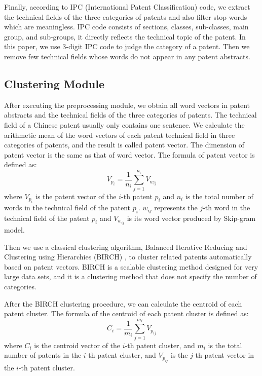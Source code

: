\documentclass[conference]{IEEEtran}
\begin{document}
\begin{CJK}{UTF8}{gbsn}
	Finally, according to IPC (International Patent Classification) code, we extract the technical fields of the three categories of patents and also filter stop words which are meaningless. IPC code consists of sections, classes, sub-classes, main group, and sub-groups, it directly reflects the technical topic of the patent. In this paper, we use 3-digit IPC code to judge the category of a patent. Then we remove few technical fields whose words do not appear in any patent abstracts.
	
	\subsection{Clustering Module}
	After executing the preprocessing module, we obtain all word vectors in patent abstracts and the technical fields of the three categories of patents. The technical field of a Chinese patent usually only contains one sentence. We calculate the arithmetic mean of the word vectors of each patent technical field in three categories of patents, and the result is called patent vector. The dimension of patent vector is the same as that of word vector. The formula of patent vector is defined as:
	\begin{equation}
	V_{p_i}=\frac{1}{n_i}\sum_{j = 1} ^{n_i} V_{w_{ij}}\label{eq1}
	\end{equation}
	where $V_{p_i}$ is the patent vector of the $i$-th patent $p_i$ and $n_i$ is the total number of words in the technical field of the patent $p_i$. $w_{ij}$ represents the $j$-th word in the technical field of the patent $p_i$ and $V_{w_{ij}}$ is its word vector produced by Skip-gram model.
	
	Then we use a classical clustering algorithm, Balanced Iterative Reducing and Clustering using Hierarchies (BIRCH) \cite{b24}, to cluster related patents automatically based on patent vectors. BIRCH is a scalable clustering method designed for very large data sets, and it is a clustering method that does not specify the number of categories.
	
	After the BIRCH clustering procedure, we can calculate the centroid of each patent cluster. The formula of the centroid of each patent cluster is defined as:
	\begin{equation}
	C_i=\frac{1}{m_i}\sum_{j = 1} ^{m_i} V_{p_{ij}}\label{eq2}
	\end{equation}
	where $C_i$ is the centroid vector of the $i$-th patent cluster, and $m_i$ is the total number of patents in the $i$-th patent cluster, and $V_{p_{ij}}$ is the $j$-th patent vector in the $i$-th patent cluster.
	

\end{CJK}
\end{document}
